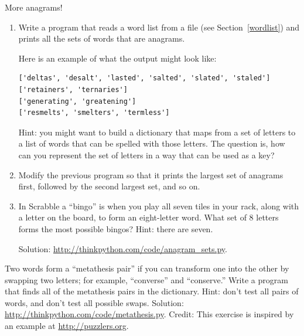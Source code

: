 \documentclass[10pt]{book}
\begin{document}
\begin{CJK}{UTF8}{gbsn}
\begin{exercise}
\end{exercise}


\begin{exercise}
\label{anagrams}

More anagrams!

\begin{enumerate}

\item Write a program
that reads a word list from a file (see Section~\ref{wordlist}) and
prints all the sets of words that are anagrams.

Here is an example of what the output might look like:

\begin{verbatim}
['deltas', 'desalt', 'lasted', 'salted', 'slated', 'staled']
['retainers', 'ternaries']
['generating', 'greatening']
['resmelts', 'smelters', 'termless']
\end{verbatim}
%
Hint: you might want to build a dictionary that maps from a
set of letters to a list of words that can be spelled with those
letters.  The question is, how can you represent the set of
letters in a way that can be used as a key?

\item Modify the previous program so that it prints the largest set
of anagrams first, followed by the second largest set, and so on.

\item In Scrabble a ``bingo'' is when you play all seven tiles in
your rack, along with a letter on the board, to form an eight-letter
word.  What set of 8 letters forms the most possible bingos?
Hint: there are seven.


Solution: \url{http://thinkpython.com/code/anagram_sets.py}.

\end{enumerate}
\end{exercise}

\begin{exercise}

Two words form a ``metathesis pair'' if you can transform one into the
other by swapping two letters; for example, ``converse'' and
``conserve.''  Write a program that finds all of the metathesis pairs
in the dictionary.  Hint: don't test all pairs of words, and don't
test all possible swaps.  Solution: \url{http://thinkpython.com/code/metathesis.py}.
Credit: This exercise is inspired by an example at \url{http://puzzlers.org}.


\end{exercise}
\end{CJK}
\end{document}
